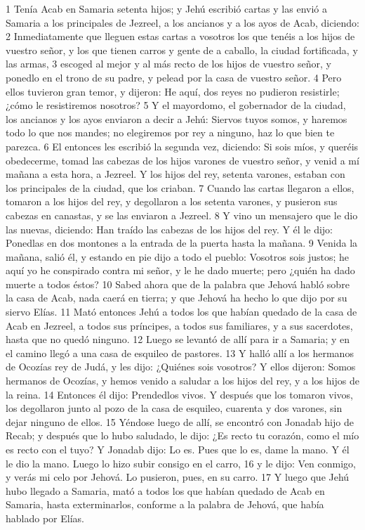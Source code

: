 1 Tenía Acab en Samaria setenta hijos; y Jehú escribió cartas y las envió a Samaria a los principales de Jezreel, a los ancianos y a los ayos de Acab, diciendo:
2 Inmediatamente que lleguen estas cartas a vosotros los que tenéis a los hijos de vuestro señor, y los que tienen carros y gente de a caballo, la ciudad fortificada, y las armas,
3 escoged al mejor y al más recto de los hijos de vuestro señor, y ponedlo en el trono de su padre, y pelead por la casa de vuestro señor.
4 Pero ellos tuvieron gran temor, y dijeron: He aquí, dos reyes no pudieron resistirle; ¿cómo le resistiremos nosotros?
5 Y el mayordomo, el gobernador de la ciudad, los ancianos y los ayos enviaron a decir a Jehú: Siervos tuyos somos, y haremos todo lo que nos mandes; no elegiremos por rey a ninguno, haz lo que bien te parezca.
6 El entonces les escribió la segunda vez, diciendo: Si sois míos, y queréis obedecerme, tomad las cabezas de los hijos varones de vuestro señor, y venid a mí mañana a esta hora, a Jezreel. Y los hijos del rey, setenta varones, estaban con los principales de la ciudad, que los criaban.
7 Cuando las cartas llegaron a ellos, tomaron a los hijos del rey, y degollaron a los setenta varones, y pusieron sus cabezas en canastas, y se las enviaron a Jezreel.
8 Y vino un mensajero que le dio las nuevas, diciendo: Han traído las cabezas de los hijos del rey. Y él le dijo: Ponedlas en dos montones a la entrada de la puerta hasta la mañana.
9 Venida la mañana, salió él, y estando en pie dijo a todo el pueblo: Vosotros sois justos; he aquí yo he conspirado contra mi señor, y le he dado muerte; pero ¿quién ha dado muerte a todos éstos?
10 Sabed ahora que de la palabra que Jehová habló sobre la casa de Acab, nada caerá en tierra; y que Jehová ha hecho lo que dijo por su siervo Elías.
11 Mató entonces Jehú a todos los que habían quedado de la casa de Acab en Jezreel, a todos sus príncipes, a todos sus familiares, y a sus sacerdotes, hasta que no quedó ninguno.
12 Luego se levantó de allí para ir a Samaria; y en el camino llegó a una casa de esquileo de pastores.
13 Y halló allí a los hermanos de Ocozías rey de Judá, y les dijo: ¿Quiénes sois vosotros? Y ellos dijeron: Somos hermanos de Ocozías, y hemos venido a saludar a los hijos del rey, y a los hijos de la reina.
14 Entonces él dijo: Prendedlos vivos. Y después que los tomaron vivos, los degollaron junto al pozo de la casa de esquileo, cuarenta y dos varones, sin dejar ninguno de ellos.
15 Yéndose luego de allí, se encontró con Jonadab hijo de Recab; y después que lo hubo saludado, le dijo: ¿Es recto tu corazón, como el mío es recto con el tuyo? Y Jonadab dijo: Lo es. Pues que lo es, dame la mano. Y él le dio la mano. Luego lo hizo subir consigo en el carro,
16 y le dijo: Ven conmigo, y verás mi celo por Jehová. Lo pusieron, pues, en su carro.
17 Y luego que Jehú hubo llegado a Samaria, mató a todos los que habían quedado de Acab en Samaria, hasta exterminarlos, conforme a la palabra de Jehová, que había hablado por Elías.
